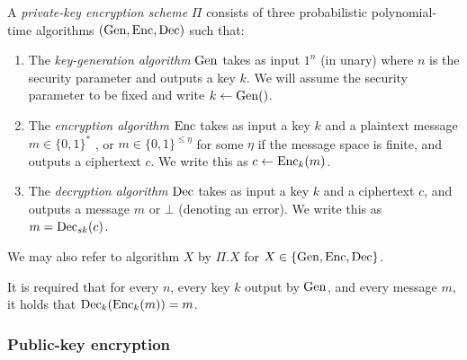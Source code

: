 
\begin{definition}
	A \emph{private-key encryption scheme} $\Pi$ consists of three probabilistic polynomial-time algorithms $(\mathrm{Gen}, \mathrm{Enc}, \mathrm{Dec})$ such that:
	\begin{enumerate}[1.]
		\item The \emph{key-generation algorithm} $\mathrm{Gen}$ takes as input $1^n$ (in unary) where $n$ is the security parameter and outputs a key $k$. We will assume the security parameter to be fixed and write $k \leftarrow \mathrm{Gen}()$.
		\item The \emph{encryption algorithm} $\mathrm{Enc}$ takes as input a key $k$ and a plaintext message $m \in \{0, 1\}^*$ , or $m \in \{0, 1\}^{\le \eta}$ for some $\eta$ if the message space is finite, and outputs a ciphertext $c$. We write this as $c \leftarrow \mathrm{Enc}_k(m)$.
		\item The \emph{decryption algorithm} $\mathrm{Dec}$ takes as input a key $k$ and a ciphertext $c$, and outputs a message $m$ or $\bot$ (denoting an error). We write this as $m = \mathrm{Dec}_{sk}(c)$.
	\end{enumerate}

	We may also refer to algorithm $X$ by $\Pi.X$ for $X \in \{\mathrm{Gen}, \mathrm{Enc}, \mathrm{Dec}\}$.

	It is required that for every $n$, every key $k$ output by $\mathrm{Gen}$, and every message $m$, it holds that $\mathrm{Dec}_k(\mathrm{Enc}_k(m)) = m$.
\end{definition}

\subsubsection{Public-key encryption}

